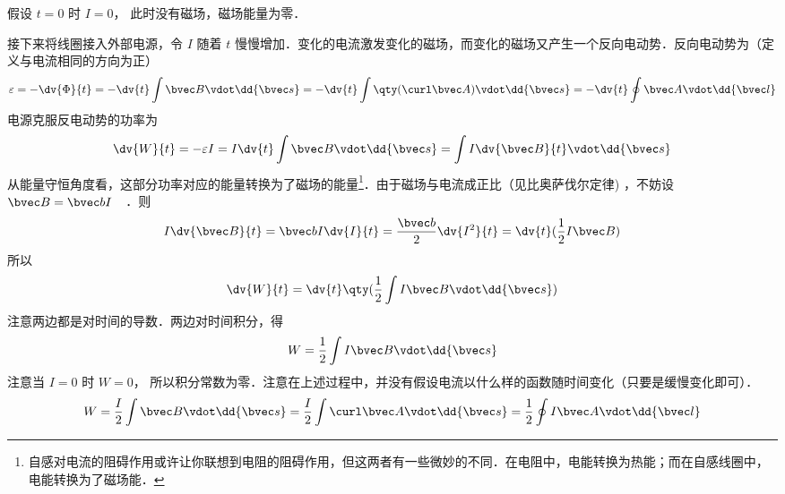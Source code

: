 假设 $t = 0$ 时 $I = 0$， 此时没有磁场，磁场能量为零．

接下来将线圈接入外部电源，令 $I$ 随着 $t$ 慢慢增加．变化的电流激发变化的磁场，而变化的磁场又产生一个反向电动势．反向电动势为（定义与电流相同的方向为正）
\begin{equation}\label{BEng_eq2}
\varepsilon  =  - \dv{\Phi}{t} =  - \dv{t} \int \bvec B \vdot \dd{\bvec s} 
=  - \dv{t} \int \qty(\curl \bvec A) \vdot \dd{\bvec s} 
=  - \dv{t} \oint \bvec A \vdot \dd{\bvec l}
\end{equation}
电源克服反电动势的功率为
\begin{equation}\label{BEng_eq3}
\dv{W}{t} =  - \varepsilon I = I\dv{t} \int \bvec B \vdot \dd{\bvec s} = \int I \dv{\bvec B}{t} \vdot \dd{\bvec s}
\end{equation}
从能量守恒角度看，这部分功率对应的能量转换为了磁场的能量\footnote{自感对电流的阻碍作用或许让你联想到电阻的阻碍作用，但这两者有一些微妙的不同．在电阻中，电能转换为热能；而在自感线圈中，电能转换为了磁场能．}．由于磁场与电流成正比（见比奥萨伐尔定律)
，不妨设 $\bvec B = \bvec bI$　．则
\begin{equation}\label{BEng_eq4}
I \dv{\bvec B}{t} = \bvec bI \dv{I}{t} = \frac{\bvec b}{2} \dv{I^2}{t} = \dv{t} (\frac12 I\bvec B)
\end{equation}
所以
\begin{equation}\label{BEng_eq5}
\dv{W}{t} = \dv{t} \qty(\frac12 \int I\bvec B \vdot \dd{\bvec s})
\end{equation}
注意两边都是对时间的导数．两边对时间积分，得
\begin{equation}\label{BEng_eq6}
W = \frac12 \int I\bvec B \vdot \dd{\bvec s}
\end{equation}
注意当 $I = 0$ 时 $ W = 0$， 所以积分常数为零．注意在上述过程中，并没有假设电流以什么样的函数随时间变化（只要是缓慢变化即可）．
\begin{equation}\label{BEng_eq7}
W = \frac{I}{2} \int \bvec B \vdot \dd{\bvec s}  = \frac{I}{2} \int \curl \bvec A \vdot \dd{\bvec s}  = \frac12 \oint I\bvec A \vdot \dd{\bvec l}
\end{equation}
 